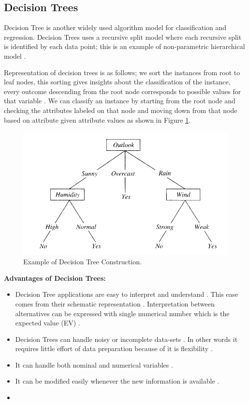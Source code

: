 \documentclass[sigconf]{acmart}
\begin{document}
\subsection{Decision Trees}
 
Decision Tree is another widely used algorithm model for classification and regression. Decision Trees uses a recursive split model where each recursive split is identified by each data point; this is an example of non-parametric hierarchical model \cite{HASSAN201752}. 
\par Representation of decision trees is as follows; we sort the instances from root to leaf nodes, this sorting gives insights about the classification of the instance, every outcome descending from the root node corresponds to possible values for that variable \cite{www-cs.princeton}. We can classify an instance by starting from the root node and checking the attributes labeled on that node and moving down from that node based on attribute given attribute values \cite{www-cs.princeton} as shown in Figure \ref{fig:Decision Tree}. 

 \begin{figure}[!ht]
  \centering
      \includegraphics[width=\columnwidth]{images/decison_tree.png}
  \caption{Example of Decision Tree Construction\cite{www-cs.princeton}.}\label{fig:Decision Tree}
\end{figure}

\textbf{Advantages of Decision Trees:}

\begin{itemize}
\item Decision Tree applications are easy to interpret and understand \cite{www-cs.ubb}. This ease comes from their schematic representation \cite{www-cs.ubb}. Interpretation between alternatives can be expressed with single numerical number which is the expected value (EV) \cite{www-cs.ubb}.  
\item Decision Trees can handle noisy or incomplete data-sets \cite{www-cs.ubb}. In other words it requires little effort of data preparation because of it is flexibility \cite{www-simafore}.  
\item It can handle both nominal and numerical variables \cite{www-cs.ubb}.
\item It can be modified easily whenever the new information is available \cite{www-cs.ubb}.
\item 
\end{itemize}
\end{document}

